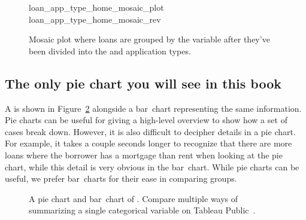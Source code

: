 \begin{figure}[h]
  \centering
      {loan_app_type_home_mosaic_plot}
      {loan_app_type_home_mosaic_rev}
  \caption{Mosaic plot where loans are grouped by
      the  variable after they've
      been divided into the  and
       application types.}
  \label{loan_app_type_home_mosaic_rev}
\end{figure}


\newpage 
%
\subsection{The only pie chart you will see in this book}

A  is shown in
Figure~\ref{loan_homeownership_pie_chart} alongside
a bar~chart representing the same information.
Pie charts can be useful for giving a high-level overview
to show how a set of cases break down.
However, it is also difficult to decipher details
in a pie chart.
For example, it takes a couple seconds longer to recognize
that there are more loans where the borrower has
a mortgage than rent when looking at the pie chart,
while this detail is very obvious in the bar~chart.
While pie charts can be useful, we prefer bar~charts
for their ease in comparing groups.

\begin{figure}[h]
  \centering
{}
  \caption{A pie chart and bar~chart of .  Compare multiple ways of summarizing a single categorical variable on Tableau Public~.}
  \label{loan_homeownership_pie_chart}
\end{figure}




